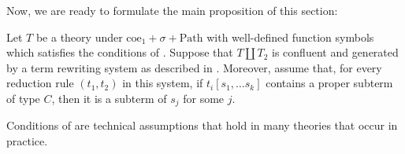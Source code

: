 \documentclass[reqno]{amsart}
\theoremstyle{definition}
\theoremstyle{remark}
\newcommand{\coeT}{\mathrm{coe}}
\newcommand{\PathT}{\mathrm{Path}}
\numberwithin{figure}{section}
\begin{document}
Now, we are ready to formulate the main proposition of this section:
\begin{prop}
Let $T$ be a theory under $\coeT_1 + \sigma + \PathT$ with well-defined function symbols which satisfies the conditions of .
Suppose that $T \amalg T_2$ is confluent and generated by a term rewriting system as described in .
Moreover, assume that, for every reduction rule $(t_1,t_2)$ in this system, if $t_i[s_1, \ldots s_k]$ contains a proper subterm of type $C$, then it is a subterm of $s_j$ for some $j$.
\end{prop}

\begin{remark}
Conditions of  are technical assumptions that hold in many theories that occur in practice.
\end{remark}
\end{document}
